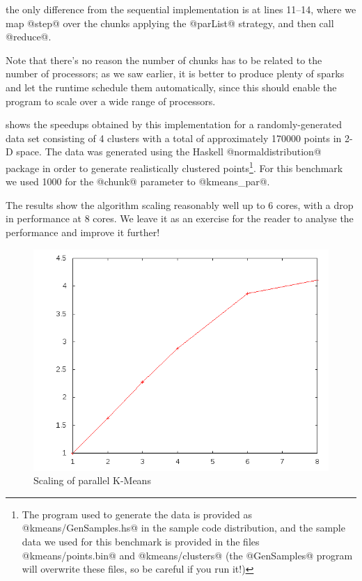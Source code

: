 \noindent the only difference from the sequential implementation is at
lines 11--14, where we map @step@ over the chunks applying the
@parList@ strategy, and then call @reduce@.

Note that there's no reason the number of chunks has to be related to
the number of processors; as we saw earlier, it is better to produce
plenty of sparks and let the runtime schedule them automatically,
since this should enable the program to scale over a wide range of
processors.

 shows the speedups obtained by this
implementation for a randomly-generated data set consisting of 4
clusters with a total of approximately 170000 points in 2-D space.
The data was generated using the Haskell @normaldistribution@ package
in order to generate realistically clustered points\footnote{The
  program used to generate the data is provided as
  @kmeans/GenSamples.hs@ in the sample code distribution, and the
  sample data we used for this benchmark is provided in the files
  @kmeans/points.bin@ and @kmeans/clusters@ (the @GenSamples@ program
  will overwrite these files, so be careful if you run it!)}.  For this
benchmark we used 1000 for the @chunk@ parameter to @kmeans_par@.

The results show the algorithm scaling reasonably well up to 6 cores,
with a drop in performance at 8 cores.  We leave it as an exercise for
the reader to analyse the performance and improve it further!

\begin{figure}
\begin{center}
\includegraphics[scale=0.4]{kmeans-results.png}
\end{center}
\caption{Scaling of parallel K-Means}
\label{fig:kmeans-results}
\end{figure}

